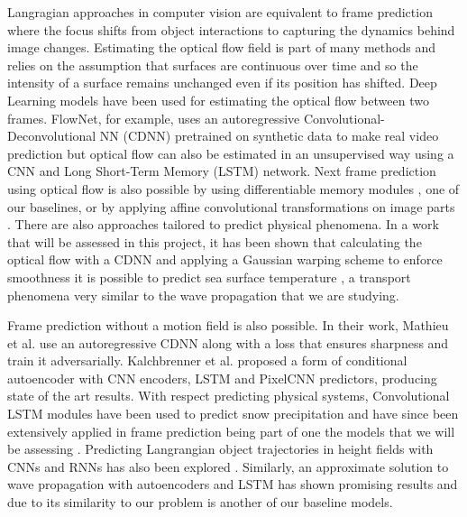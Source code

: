 \documentclass[a4paper,11pt]{article}
\begin{document}
 Langragian approaches in computer vision are equivalent to frame prediction where the focus shifts from object interactions to capturing the dynamics behind image changes. Estimating the optical flow field is part of many methods and relies on the assumption that surfaces are continuous over time and so the intensity of a surface remains unchanged even if its position has shifted. Deep Learning models have been used for estimating the optical flow between two frames.  FlowNet, for example, uses an autoregressive Convolutional-Deconvolutional NN (CDNN) pretrained on synthetic data to make real video prediction \cite{fischer2015flownet} but optical flow can also be estimated in an unsupervised way \cite{jason2016back} using a CNN and Long Short-Term Memory (LSTM) \cite{hochreiter1997longlstm} network. Next frame prediction using optical flow is also possible by using differentiable memory modules \cite{patraucean2015spatio}, one of our baselines, or by applying affine convolutional transformations on image parts \cite{finn2016unsupervised}. There are also approaches tailored to predict physical phenomena. In a work that will be assessed in this project, it has been shown that calculating the optical flow with a CDNN and applying a Gaussian warping scheme to enforce smoothness it is possible to predict sea surface temperature \cite{bezenac2017deep}, a transport phenomena very similar to the wave propagation that we are studying.

Frame prediction without a motion field is also possible. In their work, Mathieu et al. \cite{mathieu2015deep} use an autoregressive CDNN along with a loss that ensures sharpness and train it adversarially. Kalchbrenner et al. proposed a form of conditional autoencoder with CNN encoders, LSTM and PixelCNN predictors, producing state of the art results. With respect predicting physical systems, Convolutional LSTM \cite{xingjian2015convolutional} modules have been used to predict snow precipitation and have since been extensively applied in frame prediction being part of one the models that we will be assessing \cite{patraucean2015spatio}. Predicting Langrangian object trajectories in height fields with CNNs and RNNs has also been explored \cite{ehrhardt2017learning}. Similarly, an approximate solution to wave propagation with autoencoders and LSTM has shown promising results \cite{sorteberg2018approximating} and due to its similarity to our problem is another of our baseline models.
 
\end{document}
